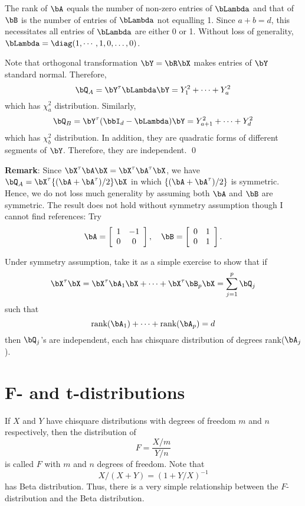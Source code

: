 The rank of $\bA$ equals the number of non-zero entries of
$\bLambda$ and that of $\bB$ is the number of entries
of $\bLambda$ not equalling 1. Since $a+b = d$, this 
necessitates all entries of $\bLambda$ are either 0
or 1. Without loss of generality, $\bLambda = \diag (1, \cdots, 1, 0, \ldots, 0)$.

Note that orthogonal transformation $\bY = \bR \bX$ 
makes entries of $\bY$ \iid standard normal. Therefore,
\[
\bQ_A = \bY^\tau \bLambda \bY = Y_1^2 + \cdots + Y_a^2
\]
which has $\chi_a^2$ distribution. Similarly,
\[
\bQ_B = \bY^\tau (\bbI_d - \bLambda) \bY = Y_{a+1}^2 + \cdots + Y_d^2
\]
which has $\chi_b^2$ distribution.
In addition, they are quadratic forms of different segments of
$\bY$. Therefore, they are independent.
\qed
\vs

{\bf Remark}: 
Since $\bX^\tau \bA \bX = \bX^\tau \bA^\tau \bX$, we have
$\bQ_A = \bX^\tau \{(\bA+ \bA^\tau)/2\} \bX$ in which
$\{(\bA+ \bA^\tau)/2\} $ is symmetric. Hence, we do not
loss much generality by assuming both $\bA$ and $\bB$
are symmetric. The result does not hold without symmetry
assumption though I cannot find references: Try
\[
\bA = 
\left [
\begin{array}{cc}
1 & -1\\
0 & 0 
\end{array}
\right ], ~~~
\bB = 
\left [
\begin{array}{cc}
0 & 1\\
0 & 1 
\end{array}
\right ].
\]

\vs
Under symmetry assumption, take it as a simple exercise to show that if
\[
\bX^\tau \bX 
= \bX^\tau \bA_1 \bX +  \cdots + \bX^\tau \bB_p \bX
= \sum_{j=1}^p \bQ_j
\]
such that
\[
\mbox{rank}(\bA_1) + \cdots + \mbox{rank}(\bA_p) =d
\]
then $\bQ_j$'s are independent,
each has chisquare distribution
of degrees rank($\bA_j$).




\section{F- and t-distributions}

If $X$ and $Y$ have chisquare distributions with
degrees of freedom $m$ and $n$ respectively, then
the distribution of
\[
F = \frac{X/m}{Y/n}
\]
is called $F$ with $m$ and $n$ degrees of freedom.
Note that
\[
X/(X+Y)= (1+ Y/X)^{-1}
\]
has Beta distribution. Thus, there is a very
simple relationship between the $F$-distribution
and the Beta distribution.

